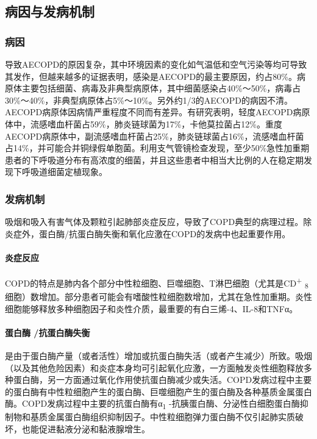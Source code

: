 \subsection{病因与发病机制}

\subsubsection{病因}

导致AECOPD的原因复杂，其中环境因素的变化如气温低和空气污染等均可导致其发作，但越来越多的证据表明，感染是AECOPD的最主要原因，约占80\%。病原体主要包括细菌、病毒及非典型病原体，其中细菌感染占40\%～50\%，病毒占30\%～40\%，非典型病原体占5\%～10\%。另外约1/3的AECOPD的病因不清。AECOPD病原体因病情严重程度不同而有差异。有研究表明，轻度AECOPD病原体中，流感嗜血杆菌占59\%，肺炎链球菌为17\%，卡他莫拉菌占12\%。重度AECOPD病原体中，副流感嗜血杆菌占25\%，肺炎链球菌占16\%，流感嗜血杆菌占14\%，并可能合并铜绿假单胞菌。利用支气管镜检查发现，至少50\%急性加重期患者的下呼吸道分布有高浓度的细菌，并且这些患者中相当大比例的人在稳定期发现下呼吸道细菌定植现象。

\subsubsection{发病机制}

吸烟和吸入有害气体及颗粒引起肺部炎症反应，导致了COPD典型的病理过程。除炎症外，蛋白酶/抗蛋白酶失衡和氧化应激在COPD的发病中也起重要作用。

\paragraph{炎症反应}

COPD的特点是肺内各个部分中性粒细胞、巨噬细胞、T淋巴细胞（尤其是CD\textsuperscript{+}
\textsubscript{8}
细胞）数增加。部分患者可能会有嗜酸性粒细胞数增加，尤其在急性加重期。炎性细胞能够释放多种细胞因子和炎性介质，最重要的有白三烯-4、IL-8和TNFα。

\paragraph{蛋白酶 /抗蛋白酶失衡}

是由于蛋白酶产量（或者活性）增加或抗蛋白酶失活（或者产生减少）所致。吸烟（以及其他危险因素）和炎症本身均可引起氧化应激，一方面触发炎性细胞释放多种蛋白酶，另一方面通过氧化作用使抗蛋白酶减少或失活。COPD发病过程中主要的蛋白酶有中性粒细胞产生的蛋白酶、巨噬细胞产生的蛋白酶及各种基质金属蛋白酶。COPD发病过程中主要的抗蛋白酶有α\textsubscript{1}
-抗胰蛋白酶、分泌性白细胞蛋白酶抑制物和基质金属蛋白酶组织抑制因子。中性粒细胞弹力蛋白酶不仅引起肺实质破坏，也能促进黏液分泌和黏液腺增生。

